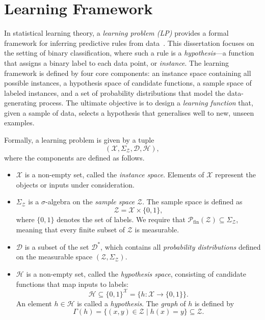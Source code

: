 \section{Learning Framework}

In statistical learning theory, a \emph{learning problem (LP)} provides a formal framework for inferring predictive rules from data~\cite{StatisticalLearningTheory}. This dissertation focuses on the setting of binary classification, where such a rule is a \emph{hypothesis}—a function that assigns a binary label to each data point, or \emph{instance}. The learning framework is defined by four core components: an instance space containing all possible instances, a hypothesis space of candidate functions, a sample space of labeled instances, and a set of probability distributions that model the data-generating process. The ultimate objective is to design a \emph{learning function} that, given a sample of data, selects a hypothesis that generalises well to new, unseen examples.


Formally, a learning problem is given by a tuple
\[
    (\mathcal{X}, \Sigma_{\mathcal{Z}}, \mathcal{D}, \mathcal{H}),
\]
where the components are defined as follows.

\begin{itemize}
    \item $\mathcal{X}$ is a non-empty set, called the \emph{instance space}. Elements of $\mathcal{X}$ represent the objects or inputs under consideration.

    \item $\Sigma_{\mathcal{Z}}$ is a $\sigma$-algebra on the \emph{sample space} $\mathcal{Z}$. The sample space is defined as
    \[
        \mathcal{Z} = \mathcal{X} \times \{0,1\},
    \]
    where $\{0,1\}$ denotes the set of labels.
    We require that $\mathcal{P}_{\mathrm{fin}}(\mathcal{Z}) \subseteq \Sigma_{\mathcal{Z}}$, meaning that every finite subset of $\mathcal{Z}$ is measurable.

    \item $\mathcal{D}$ is a subset of the set $\mathcal{D}^*$, which contains all \emph{probability distributions} defined on the measurable space $(\mathcal{Z}, \Sigma_{\mathcal{Z}})$.

    \item $\mathcal{H}$ is a non-empty set, called the \emph{hypothesis space}, consisting of candidate functions that map inputs to labels:
    \[
        \mathcal{H} \subseteq \{0,1\}^\mathcal{X} = \{h : \mathcal{X} \to \{0,1\}\}.
    \]
    An element $h \in \mathcal{H}$ is called a \emph{hypothesis}.
    The \emph{graph} of $h$ is defined by
    \[
        \Gamma(h) = \{(x,y) \in \mathcal{Z} \mid h(x) = y\} \subseteq \mathcal{Z}.
    \]
\end{itemize}


